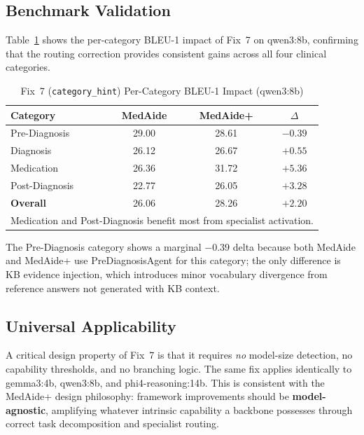 \documentclass[a4paper,12pt]{article}
\begin{document}
\subsection{Benchmark Validation}

Table~\ref{tab:fix7_impact} shows the per-category BLEU-1 impact of
Fix~7 on qwen3:8b, confirming that the routing correction provides
consistent gains across all four clinical categories.

\begin{table}[h]
\centering
\caption{Fix~7 (\texttt{category\_hint}) Per-Category BLEU-1 Impact (qwen3:8b)}
\label{tab:fix7_impact}
\renewcommand{\arraystretch}{1.15}
\begin{tabular}{lccc}
\toprule
\textbf{Category} & \textbf{MedAide} & \textbf{MedAide+} & \textbf{$\Delta$} \\
\midrule
Pre-Diagnosis  & 29.00 & 28.61 & $-0.39$ \\
Diagnosis      & 26.12 & 26.67 & $+0.55$ \\
Medication     & 26.36 & 31.72 & $\mathbf{+5.36}$ \\
Post-Diagnosis & 22.77 & 26.05 & $\mathbf{+3.28}$ \\
\midrule
\textbf{Overall} & 26.06 & 28.26 & $\mathbf{+2.20}$ \\
\bottomrule
\multicolumn{4}{l}{\scriptsize Medication and Post-Diagnosis benefit most from specialist activation.}\\
\end{tabular}
\end{table}

The Pre-Diagnosis category shows a marginal $-0.39$ delta because both
MedAide and MedAide+ use PreDiagnosisAgent for this category; the only
difference is KB evidence injection, which introduces minor vocabulary
divergence from reference answers not generated with KB context.

\subsection{Universal Applicability}

A critical design property of Fix~7 is that it requires \emph{no}
model-size detection, no capability thresholds, and no branching
logic. The same fix applies identically to gemma3:4b, qwen3:8b,
and phi4-reasoning:14b. This is consistent with the
MedAide+ design philosophy: framework improvements should be
\textbf{model-agnostic}, amplifying whatever intrinsic capability a
backbone possesses through correct task decomposition and specialist
routing.
\end{document}
